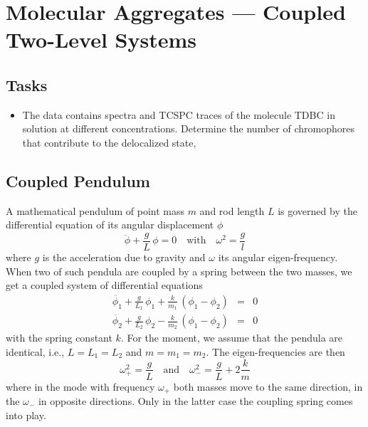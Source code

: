 

\chapter{Molecular Aggregates --- Coupled Two-Level Systems}



\section{Tasks}

\begin{itemize}
\item The data contains spectra and TCSPC traces of the molecule TDBC in solution at different concentrations. Determine the number of chromophores that contribute to the delocalized state,
\end{itemize}






\section{Coupled Pendulum}

A mathematical pendulum of point mass $m$ and rod length $L$ is governed by the differential equation of its angular displacement $\phi$
\[
 \ddot{\phi} + \frac{g}{L} \, \phi = 0 \quad \text{with} \quad \omega^2 = \frac{g}{l}
\]
where $g$ is the acceleration due to gravity and $\omega$ its angular eigen-frequency. When two of such pendula are coupled by a spring between the two masses, we get a coupled system of differential equations
\begin{eqnarray*}
 \ddot{\phi_1} + \frac{g}{L_1} \, \phi_1  + \frac{k}{m_1} \, \left( \phi_1  - \phi_2 \right)  & = &  0  \\
 \ddot{\phi_2} + \frac{g}{L_2} \, \phi_2  - \frac{k}{m_2} \, \left( \phi_1  - \phi_2 \right)  & = &  0  
\end{eqnarray*}
with the spring constant $k$.  For the moment, we assume that the pendula are identical, i.e., $L = L_1 = L_2$ and $m = m_1 =m_2$. The eigen-frequencies are then
\[
 \omega_{+}^2 = \frac{g}{L} \quad \text{and} \quad 
  \omega_{-}^2 = \frac{g}{L}  + 2 \frac{k}{m}
\]
where in the mode with frequency $\omega_{+}$ both masses move to the same direction, in the $\omega_{-}$ in opposite directions. Only in the latter case the coupling spring comes into play.

